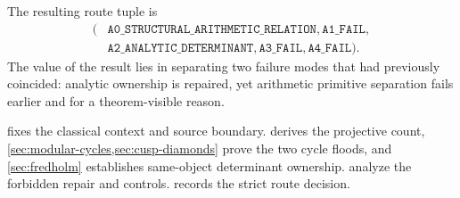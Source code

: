 The resulting route tuple is
\[
 \begin{aligned}
 (&\texttt{A0\_STRUCTURAL\_ARITHMETIC\_RELATION},
   \texttt{A1\_FAIL},\\
  &\texttt{A2\_ANALYTIC\_DETERMINANT},
   \texttt{A3\_FAIL},
   \texttt{A4\_FAIL}).
 \end{aligned}
\]
The value of the result lies in separating two failure modes that had
previously coincided: analytic ownership is repaired, yet arithmetic
primitive separation fails earlier and for a theorem-visible reason.

 fixes the classical context and source boundary.
 derives the projective count,
\cref{sec:modular-cycles,sec:cusp-diamonds} prove the two cycle floods, and
\cref{sec:fredholm} establishes same-object determinant ownership.
 analyze the forbidden repair and
controls.   records the strict route decision.
